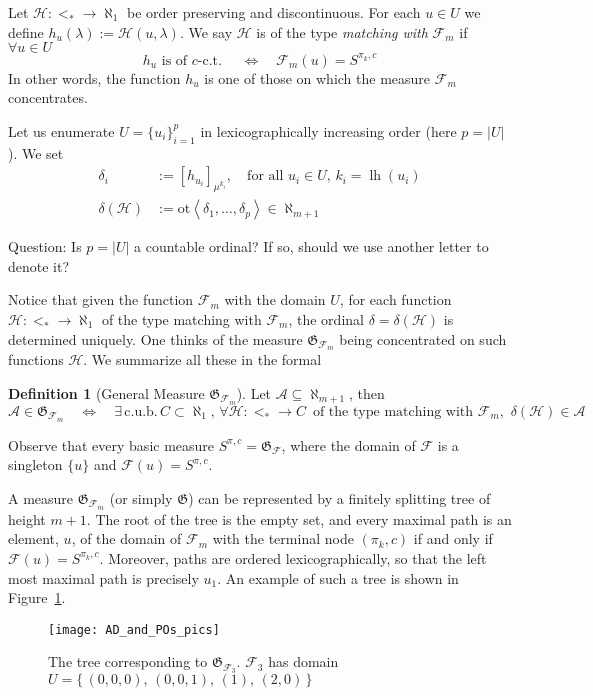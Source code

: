 \documentclass[bibother]{asl}
\theoremstyle{definition}
\newtheorem{defn}[thm]{Definition}
\theoremstyle{remark}
\newcommand{\cub}{\textrm{c.u.b.}}
\newcommand{\Cal}{\mathcal}
\newcommand{\lh}{\operatorname{lh}}
\newcommand{\sG}{\mathfrak{G}}
\newcommand{\sH}{\mathcal{H}}
\newcommand{\sA}{\mathcal{A}}
\newcommand{\sF}{\mathcal{F}}
\newcommand{\rc}[2]{{\color{red}#2}\marginnote{{\color{red}#1}}}
\begin{document}
Let $\sH:<_*\to\aleph_1$ be order preserving and discontinuous. For each $u\in U$ we define $h_u(\lambda):=\sH(u,\lambda)$. We say $\sH$ is of the type \emph{matching with} $\sF_m$ if $\forall u\in U$
$$
h_u \textrm{ is of $c$-c.t. } \quad \iff \quad \sF_m(u)=S^{\pi_k,c}
$$
In other words, the function $h_u$ is one of those on which the measure $\sF_m$ concentrates.

Let us enumerate $U=\{u_i\}^p_{i=1}$ in lexicographically increasing order (here $p=|U|$). 
We set
\begin{align*}
\delta_i & := [h_{u_i}]_{\mu^{k_i}},\quad \textrm{for all } u_i\in U,\, k_i=\lh(u_i)  \\
\delta(\Cal{H}) & := \textrm{ot} \left\langle  \delta_1,\dots,\delta_p  \right\rangle  \in \aleph_{m+1}
\end{align*}

\rc{Q:}{Question: Is $p=|U|$ a countable ordinal? If so, should we use another letter to denote it?}

Notice that given the function $\sF_m$ with the domain $U$, for each function $\sH:<_*\to\aleph_1$ of the type matching with $\sF_m$, the ordinal $\delta=\delta(\sH)$ is determined uniquely. One thinks of the measure $\sG_{\sF_m}$ being concentrated on such functions $\sH$. We summarize all these in the formal
\begin{defn} [General Measure $\sG_{\sF_m}$]  Let $\sA\subseteq \aleph_{m+1}$, then 
$$ \sA \in\sG_{\sF_m} \quad \iff\quad \exists \, \cub \, C\subset \aleph_1,
\, \forall\sH:<_*\to C \, \textrm{ of the type matching with }  \sF_m, \, \, \delta(\sH)\in\sA
$$
\end{defn}

Observe that every basic measure $S^{\pi,c}=\sG_\sF$, where the domain of $\sF$ is a singleton $\{u\}$ and $\sF(u)=S^{\pi,c}$.

A measure $\sG_{\sF_m}$ (or simply $\sG$) can be represented by a finitely splitting tree of height $m+1$. The root of the tree is the empty set, and every maximal path is an element, $u$, of the domain of $\sF_m$ with the terminal node $(\pi_k,c)$ if and only if $\sF(u)=S^{\pi_k,c}$. Moreover, paths are ordered lexicographically, so that the left most maximal path is precisely $u_1$. An example of such a tree is shown in Figure~\ref{fig:f1}.

\begin{figure}[h!]
  \centering
    \texttt{[image: AD\_and\_POs\_pics]}
  \caption{The tree corresponding to $\sG_{\sF_3}$. $\sF_3$ has domain $U=\{\, (0,0,0),\, (0,0,1),\, (1),\, (2,0)\,  \}$}
  \label{fig:f1}
\end{figure}
\end{document}
